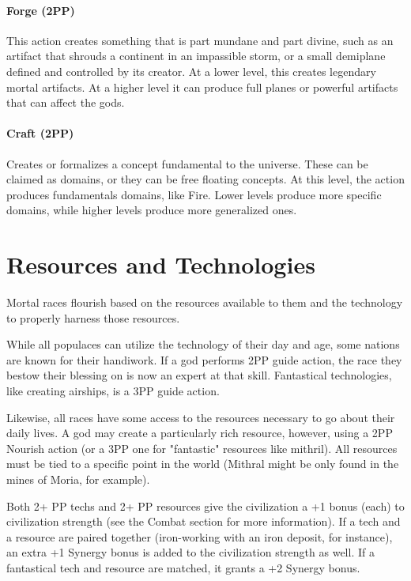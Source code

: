 \documentclass[10pt,a4paper]{article}
\begin{document}
\paragraph*{Forge (2PP)}  This action creates something that is part mundane and part divine, such as an artifact that shrouds a continent in an impassible storm, or a small demiplane defined and controlled by its creator. At a lower level, this creates legendary mortal artifacts. At a higher level it can produce full planes or powerful artifacts that can affect the gods.

\paragraph*{Craft (2PP)}  Creates or formalizes a concept fundamental to the universe. These can be claimed as domains, or they can be free floating concepts. At this level, the action produces fundamentals domains, like Fire. Lower levels produce more specific domains, while higher levels produce more generalized ones.


\section*{Resources and Technologies}
Mortal races flourish based on the resources available to them and the technology to properly harness those resources.  

While all populaces can utilize the technology of their day and age, some nations are known for their handiwork. If a god performs 2PP guide action, the race they bestow their blessing on is now an expert at that skill. Fantastical technologies, like creating airships, is a 3PP guide action.

Likewise, all races have some access to the resources necessary to go about their daily lives. A god may create a particularly rich resource, however, using a 2PP Nourish action (or a 3PP one for "fantastic" resources like mithril). All resources must be tied to a specific point in the world (Mithral might be only found in the mines of Moria, for example).

Both 2+ PP techs and 2+ PP resources give the civilization a +1 bonus (each) to civilization strength (see the Combat section for more information). If a tech and a resource are paired together (iron-working with an iron deposit, for instance), an extra +1 Synergy bonus is added to the civilization strength as well. If a fantastical tech and resource are matched, it grants a +2 Synergy bonus.
 
\end{document}
